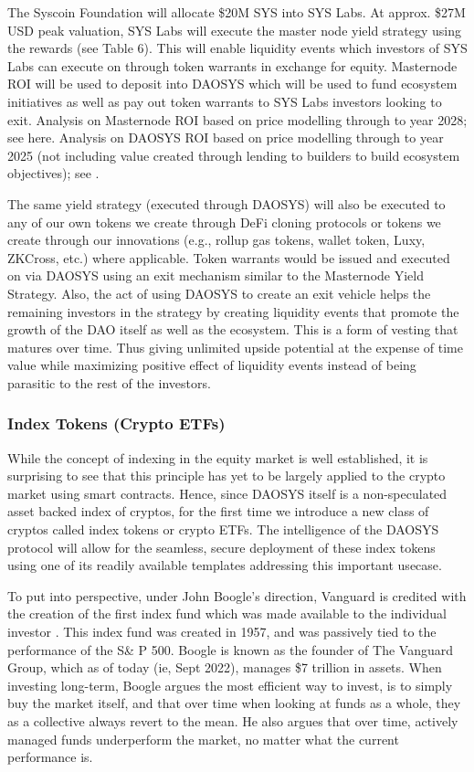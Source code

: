 \documentclass[journal,twocolumn,12pt]{ieeesyscoin}
\begin{document}
The Syscoin Foundation will allocate \$20M SYS into SYS Labs. At approx. \$27M USD peak valuation, SYS Labs will execute the master node yield strategy using the rewards (see Table 6). This will enable liquidity events which investors of SYS Labs can execute on through token warrants in exchange for equity. Masternode ROI will be used to deposit into DAOSYS which will be used to fund ecosystem initiatives as well as pay out token warrants to SYS Labs investors looking to exit. Analysis on Masternode ROI based on price modelling through to year 2028; see here. Analysis on DAOSYS ROI based on price modelling through to year 2025 (not including value created through lending to builders to build ecosystem objectives); see \cite{DAOSim22}.

The same yield strategy (executed through DAOSYS) will also be executed to any of our own tokens we create through DeFi cloning protocols or tokens we create through our innovations (e.g., rollup gas tokens, wallet token, Luxy, ZKCross, etc.) where applicable. Token warrants would be issued and executed on via DAOSYS using an exit mechanism similar to the Masternode Yield Strategy. Also, the act of using DAOSYS to create an exit vehicle helps the remaining investors in the strategy by creating liquidity events that promote the growth of the DAO itself as well as the ecosystem. This is a form of vesting that matures over time. Thus giving unlimited upside potential at the expense of time value while maximizing positive effect of liquidity events instead of being parasitic to the rest of the investors.

\subsubsection{Index Tokens (Crypto ETFs)}

While the concept of indexing in the equity market is well established, it is surprising to see that this principle has yet to be largely applied to the crypto market using smart contracts. Hence, since DAOSYS itself is a non-speculated asset backed index of cryptos, for the first time we introduce a new class of cryptos called index tokens or crypto ETFs. The intelligence of the DAOSYS protocol will allow for the seamless, secure deployment of these index tokens using one of its readily available templates addressing this important usecase.

To put into perspective, under John Boogle’s direction, Vanguard is credited with the creation of the first index fund which was made available to the individual investor \cite{Bog17}. This index fund was created in 1957, and was passively tied to the performance of the S\& P 500. Boogle is known as the founder of The Vanguard Group, which as of today (ie, Sept 2022), manages \$7 trillion in assets. When investing long-term, Boogle argues the most efficient way to invest, is to simply buy the market itself, and that over time when looking at funds as a whole, they as a collective always revert to the mean. He also argues that over time, actively managed funds underperform the market, no matter what the current performance is.
\end{document}
